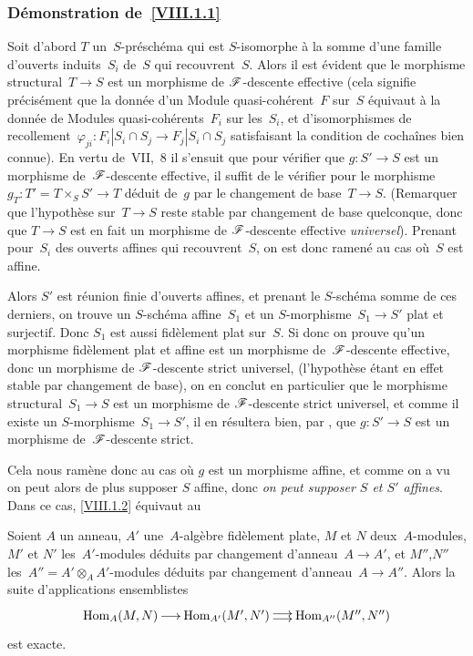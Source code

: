 \subsubsection*{D\'emonstration de~\ref{VIII.1.1}}
Soit
d'abord $T$ un~$S$-pr\'esch\'ema qui est $S$-isomorphe \`a
la somme d'une famille
d'ouverts
induits~$S_{i}$ de~$S$ qui recouvrent~$S$. Alors il est \'evident
que le morphisme structural~$T\to S$ est un morphisme de
$\cal{F}$-descente effective (cela signifie pr\'ecis\'ement que la
donn\'ee d'un Module quasi-coh\'erent~$F$ sur~$S$ \'equivaut
\`a la donn\'ee de Modules quasi-coh\'erents~$F_{i}$ sur
les~$S_{i}$, et d'isomorphismes de recollement~$\varphi_{ji}\colon
F_{i}|S_{i}\cap S_{j}\to F_{j}|S_{i}\cap S_{j}$ satisfaisant la
condition de cocha\^ines bien connue). En vertu de~VII,~8
il s'ensuit que pour v\'erifier que $g\colon S'\to S$ est un
morphisme de~$\cal{F}$-descente effective, il suffit de le
v\'erifier pour le morphisme~$g_{T}\colon T'=T\times_{S}S'\to T$
d\'eduit de~$g$ par le changement de base~$T\to S$. (Remarquer que
l'hypoth\`ese sur~$T\to S$ reste stable par changement de base
quelconque, donc que $T\to S$ est en fait un morphisme de
$\cal{F}$-descente effective \emph{universel}). Prenant pour~$S_{i}$
des ouverts affines qui recouvrent~$S$, on est donc ramen\'e au cas
o\`u~$S$ est affine.

Alors $S'$ est r\'eunion finie d'ouverts affines, et prenant le
$S$-sch\'ema somme de ces derniers, on trouve un $S$-sch\'ema
affine~$S_{1}$ et un $S$-morphisme~$S_{1}\to S'$ plat et
surjectif. Donc $S_{1}$ est aussi fid\`element plat sur~$S$. Si donc
on prouve qu'un morphisme fid\`element plat et affine est un
morphisme de~$\cal{F}$-descente effective, donc un morphisme de
$\cal{F}$-descente strict universel, (l'hypoth\`ese \'etant en
effet stable par changement de base), on en conclut en particulier que
le morphisme structural~$S_{1}\to S$ est un morphisme de
$\cal{F}$-descente strict universel, et comme il existe un
$S$-morphisme~$S_{1}\to S'$, il en r\'esultera bien, par \cite{VIII.D}, que
$g\colon S'\to S$ est un morphisme de~$\cal{F}$-descente strict.

\enlargethispage{.5cm}Cela nous ram\`ene donc au cas o\`u $g$ est un morphisme affine,
et comme on a vu on peut alors de plus supposer $S$ affine, donc
\emph{on peut supposer $S$ et $S'$ affines}. Dans ce cas,
\ref{VIII.1.2} \'equivaut au

\begin{lemme}
\label{VIII.1.4}
Soient $A$ un anneau, $A'$ une~$A$-alg\`ebre fid\`element plate,
$M$ et $N$ deux~$A$-modules, $M'$ et $N'$ les~$A'$-modules d\'eduits
par changement d'anneau~$A\to A'$, et $M''$,$N''$
les~$A''=A'\otimes_{A}A'$-modules d\'eduits par changement
d'anneau~$A\to A''$. Alors la suite d'applications ensemblistes
$$
\xymatrix@C=.5cm{{\mathrm{Hom}_{A}(M,N)}\ar[r]&{\mathrm{Hom}_{A'}(M',N')}\ar@<2pt>[r]\ar@<-2pt>[r]&{\mathrm{Hom}_{A''}(M'',N'')}}
$$
est exacte.
\end{lemme}

